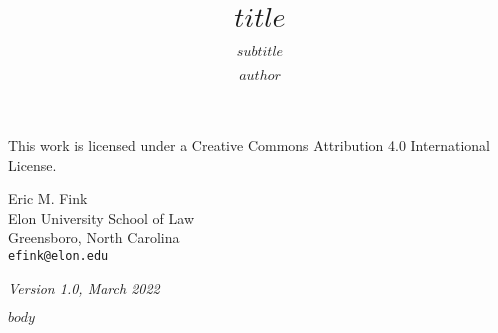 \documentclass[letterpaper,11pt,twoside,justified,marginals=raggedright]{tufte-book}
\title{$title$}
\subtitle{$subtitle$}
\author{$author$}
\date{}
\begin{document}


\frontmatter
\maketitle

\pagestyle{empty}
\begingroup
\parindent 0pt
\vspace*{\fill}
\ccbyncsa

\footnotesize
This work is licensed under a Creative Commons Attribution 4.0 International License.

Eric M. Fink \\
Elon University School of Law \\
Greensboro, North Carolina \\
\texttt{efink@elon.edu}

\itshape{Version 1.0, March 2022}

\endgroup
\clearpage

\setcounter{tocdepth}{1}
\tableofcontents

\mainmatter

$body$
\end{document}
